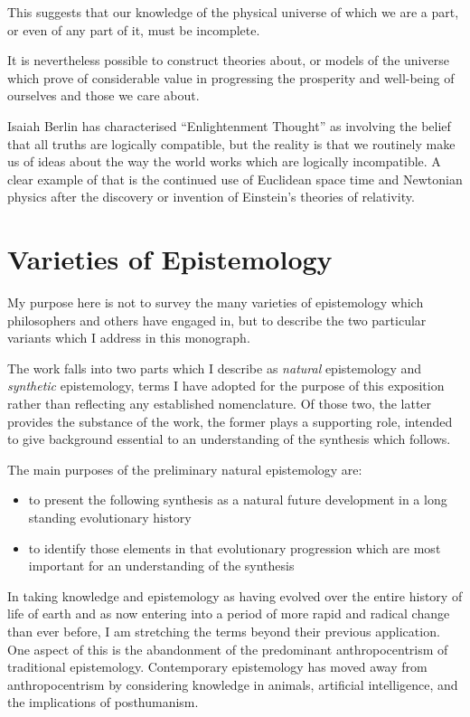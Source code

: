 \documentclass[10pt,titlepage]{book}
\begin{document}
This suggests that our knowledge of the physical universe of which we are a part, or even of any part of it, must be incomplete.

It is nevertheless possible to construct theories about, or models of the universe which prove of considerable value in progressing the prosperity and well-being of ourselves and those we care about.

Isaiah Berlin has characterised ``Enlightenment Thought'' as involving the belief that all truths are logically compatible, but the reality is that we routinely make us of ideas about the way the world works which are logically incompatible.
A clear example of that is the continued use of Euclidean space time and Newtonian physics after the discovery or invention of Einstein's theories of relativity.


\chapter{Varieties of Epistemology}


My purpose here is not to survey the many varieties of epistemology which philosophers and others have engaged in, but to describe the two particular variants which I address in this monograph.

The work falls into two parts which I describe as \emph{natural} epistemology and \emph{synthetic} epistemology, terms I have adopted for the purpose of this exposition rather than reflecting any established nomenclature.
Of those two, the latter provides the substance of the work, the former plays a supporting role, intended to give background essential to an understanding of the synthesis which follows.

The main purposes of the preliminary natural epistemology are:
\begin{itemize}
\item to present the following synthesis as a natural future development in a long standing evolutionary history
\item to identify those elements in that evolutionary progression which are most important for an understanding of the synthesis
\end{itemize}

In taking knowledge and epistemology as having evolved over the entire history of life of earth and as now entering into a period of more rapid and radical change than ever before, I am stretching the terms beyond their previous application.
One aspect of this is the abandonment of the predominant anthropocentrism of traditional epistemology.
Contemporary epistemology has moved away from anthropocentrism by considering knowledge in animals, artificial intelligence, and the implications of posthumanism.
\end{document}
